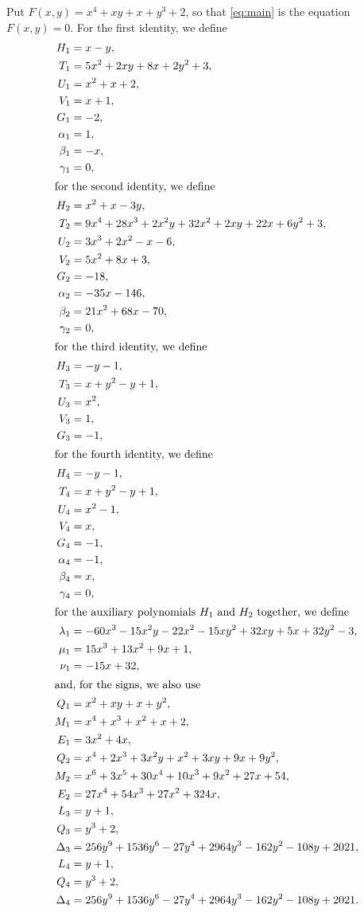 \documentclass[11pt]{article}
\begin{document}
Put $F(x,y)=x^{4}+xy+x+y^{3}+2$, so that \eqref{eq:main} is the equation $F(x,y)=0$. For the first identity, we define
\begin{align*}
H_{1}&=x-y,\\
T_{1}&=5x^{2}+2xy+8x+2y^{2}+3,\\
U_{1}&=x^{2}+x+2,\\
V_{1}&=x+1,\\
G_{1}&=-2,\\
\alpha_{1}&=1,\\
\beta_{1}&=-x,\\
\gamma_{1}&=0,\\
\intertext{for the second identity, we define}
H_{2}&=x^{2}+x-3y,\\
T_{2}&=9x^{4}+28x^{3}+2x^{2}y+32x^{2}+2xy+22x+6y^{2}+3,\\
U_{2}&=3x^{3}+2x^{2}-x-6,\\
V_{2}&=5x^{2}+8x+3,\\
G_{2}&=-18,\\
\alpha_{2}&=-35x-146,\\
\beta_{2}&=21x^{2}+68x-70,\\
\gamma_{2}&=0,\\
\intertext{for the third identity, we define}
H_{3}&=-y-1,\\
T_{3}&=x+y^{2}-y+1,\\
U_{3}&=x^{2},\\
V_{3}&=1,\\
G_{3}&=-1,\\
\intertext{for the fourth identity, we define}
H_{4}&=-y-1,\\
T_{4}&=x+y^{2}-y+1,\\
U_{4}&=x^{2}-1,\\
V_{4}&=x,\\
G_{4}&=-1,\\
\alpha_{4}&=-1,\\
\beta_{4}&=x,\\
\gamma_{4}&=0,\\
\intertext{for the auxiliary polynomials $H_{1}$ and $H_{2}$ together, we define}
\lambda_{1}&=-60x^{3}-15x^{2}y-22x^{2}-15xy^{2}+32xy+5x+32y^{2}-3,\\
\mu_{1}&=15x^{3}+13x^{2}+9x+1,\\
\nu_{1}&=-15x+32,\\
\intertext{and, for the signs, we also use}
Q_{1}&=x^{2}+xy+x+y^{2},\\
M_{1}&=x^{4}+x^{3}+x^{2}+x+2,\\
E_{1}&=3x^{2}+4x,\\
Q_{2}&=x^{4}+2x^{3}+3x^{2}y+x^{2}+3xy+9x+9y^{2},\\
M_{2}&=x^{6}+3x^{5}+30x^{4}+10x^{3}+9x^{2}+27x+54,\\
E_{2}&=27x^{4}+54x^{3}+27x^{2}+324x,\\
L_{3}&=y+1,\\
Q_{3}&=y^{3}+2,\\
\Delta_{3}&=256y^{9}+1536y^{6}-27y^{4}+2964y^{3}-162y^{2}-108y+2021,\\
L_{4}&=y+1,\\
Q_{4}&=y^{3}+2,\\
\Delta_{4}&=256y^{9}+1536y^{6}-27y^{4}+2964y^{3}-162y^{2}-108y+2021.
\end{align*}
\end{document}
